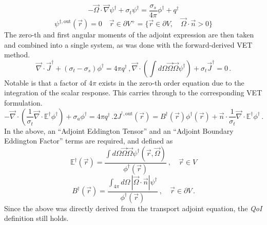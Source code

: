 \documentclass[12pt]{report}
\newcommand{\vr}{\vec{r}}
\newcommand{\vO}{\vec{\Omega}}
\renewcommand{\div}{\vec{\nabla} \cdot}
\newcommand{\grad}{\vec{\nabla}}
\newcommand{\bound}{\partial V}
\newcommand{\vn}{\vec{n}}
\newcommand{\Edd}{\mathbb{E}}
\newcommand{\BEdd}{B}
\newcommand{\sigt}{\sigma_t}
\newcommand{\sigs}{\sigma_s}
\newcommand{\siga}{\sigma_a}
\newcommand{\scalResp}{q^\dag}
\newcommand{\qoi}{{\it QoI}\xspace}
\begin{document}
\begin{equation}
\label{snAdjAlt}
- \vO \cdot \grad \psi^\dag + \sigt \psi^\dag = \frac{\sigs}{4 \pi} \phi^\dag + \scalResp
\end{equation}
%
\begin{equation}
\psi^{\dag, \text{out}}(\vr)=0 \quad \vr \in \partial V^{+} = \{  \vr \in \bound , \quad \vO \cdot \vec{n} > 0 \}
\end{equation}
The zero-th and first angular moments of the adjoint expression are then taken and combined into a single system, as was done with the forward-derived VET method.
\begin{subequations}
\begin{equation}
\label{0amAlt}
\div \vec{J}^\dag + (\sigt-\sigs) \phi^\dag  = 4\pi \scalResp \,,
\end{equation}
\begin{equation}
\label{1amAlt}
\div \left(  \int d\Omega \vO \vO \psi^\dag  \right) + \sigt \vec{J}^\dag  = 0 \,.
\end{equation}
\end{subequations}
%
Notable is that a factor of $4 \pi$ exists in the zero-th order equation due to the integration of the scalar response. This carries through to the corresponding VET formulation.
\begin{subequations}
\begin{equation}
\label{TranAdjVEFForm}
- \div \left( \frac{1}{\sigt}\div \Edd^\dag \phi^\dag  \right) + \siga \phi^\dag  = 4\pi \scalResp  \,.
\end{equation}
\begin{equation}
2 J^{^\dag,\text{out}}(\vr) = \BEdd^\dag(\vr) \phi^\dag(\vr)  + \vn \cdot \frac{1}{\sigt} \div \Edd^\dag  \phi^\dag  \,.
\end{equation}
\end{subequations}
In the above, an ``Adjoint Eddington Tensor'' and an ``Adjoint Boundary Eddington Factor'' terms are required, and defined as
\begin{equation}
\label{AdjEddDef}
\Edd^\dag(\vr)=\frac{\int d\Omega \vO \vO \psi^\dag(\vr,\vO)}{\phi^\dag(\vr)} \ , \quad \vr \in V
\end{equation} 
\begin{equation}
\BEdd^\dag(\vr) = \frac{\int_{4 \pi} d\Omega \, | \vO \cdot \vn | \psi^\dag}{\phi^\dag(\vr)} \ ,\quad  \vr \in \bound \,.
\end{equation}
Since the above was directly derived from the transport adjoint equation, the \qoi definition still holds.
\end{document}
